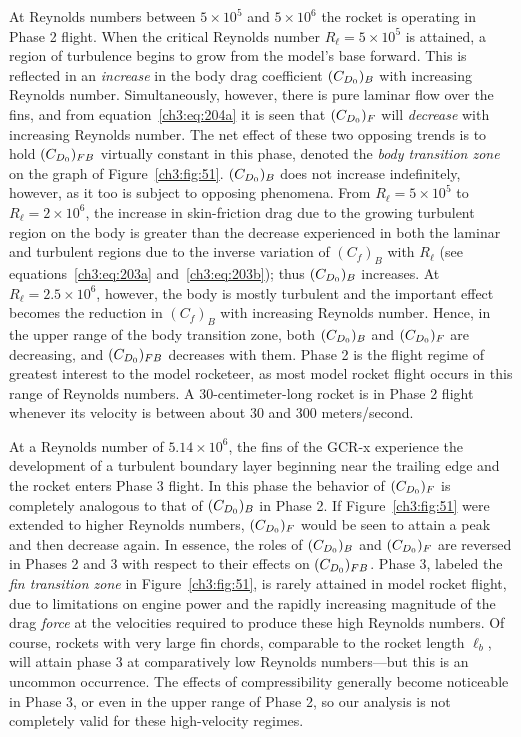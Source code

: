 At Reynolds numbers between $5 \times 10^{5}$ and $5 \times 10^{6}$ the rocket is operating in
Phase 2 flight. When the critical Reynolds number $R_\ell = 5 \times 10^{5}$ is attained, a region
of turbulence begins to grow from the model's base forward. This is reflected in an
\emph{increase} in the body drag coefficient $(C_{D_0})_B$ with increasing Reynolds number.
Simultaneously, however, there is pure laminar flow over the fins, and from
equation~\eqref{ch3:eq:204a} it is seen that $(C_{D_0})_F$ will \emph{decrease} with increasing
Reynolds number. The net effect of these two opposing trends is to hold $(C_{D_0})_{FB}$ virtually
constant in this phase, denoted the \emph{body transition zone} on the graph of
Figure~\ref{ch3:fig:51}. $(C_{D_0})_B$ does not increase indefinitely, however, as it too is subject
to opposing phenomena. From $R_\ell = 5 \times 10^{5}$ to $R_\ell = 2 \times 10^{6}$, the increase
in skin-friction drag due to the growing turbulent region on the body is greater than the decrease
experienced in both the laminar and turbulent regions due to the inverse variation of $(C_f)_B$
with $R_\ell$ (see equations~\eqref{ch3:eq:203a} and~\eqref{ch3:eq:203b}); thus $(C_{D_0})_B$
increases. At $R_\ell = 2.5 \times 10^{6}$, however, the body is mostly turbulent and the
important effect becomes the reduction in $(C_f)_B$ with increasing Reynolds number. Hence, in the
upper range of the body transition zone, both $(C_{D_0})_B$ and $(C_{D_0})_F$ are decreasing, and
$(C_{D_0})_{FB}$ decreases with them. Phase 2 is the flight regime of greatest interest to the model
rocketeer, as most model rocket flight occurs in this range of Reynolds numbers. A
30-centimeter-long rocket is in Phase 2 flight whenever its velocity is between about 30 and 300
meters/second.

At a Reynolds number of $5.14 \times 10^{6}$, the fins of the GCR-x experience the development of
a turbulent boundary layer beginning near the trailing edge and the rocket enters Phase 3 flight.
In this phase the behavior of $(C_{D_0})_F$ is completely analogous to that of $(C_{D_0})_B$ in Phase 2.
If Figure~\ref{ch3:fig:51} were extended to higher Reynolds numbers, $(C_{D_0})_F$ would be seen to
attain a peak and then decrease again. In essence, the roles of $(C_{D_0})_B$ and $(C_{D_0})_F$ are
reversed in Phases 2 and 3 with respect to their effects on $(C_{D_0})_{FB}$. Phase 3, labeled the
\emph{fin transition zone} in Figure~\ref{ch3:fig:51}, is rarely attained in model rocket flight,
due to limitations on engine power and the rapidly increasing magnitude of the drag \emph{force}
at the velocities required to produce these high Reynolds numbers. Of course, rockets with very
large fin chords, comparable to the rocket length $\ell_b$, will attain phase 3 at comparatively
low Reynolds numbers---but this is an uncommon occurrence. The effects of compressibility
generally become noticeable in Phase 3, or even in the upper range of Phase 2, so our analysis is
not completely valid for these high-velocity regimes.

